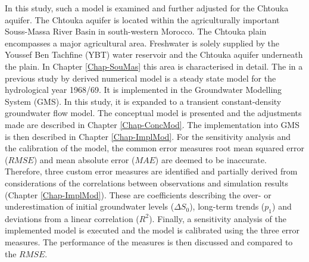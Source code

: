 In this study, such a model is examined and further adjusted for the Chtouka aquifer. The Chtouka aquifer is located within the agriculturally important Souss-Massa River Basin in south-western Morocco. The Chtouka plain encompasses a major agricultural area. Freshwater is solely supplied by the Youssef Ben Tachfine (YBT) water reservoir and the Chtouka aquifer underneath the plain. In Chapter \ref{Chap-SouMas} this area is characterised in detail. The in a previous study by \textcite{Horn.2021} derived numerical model is a steady state model for the hydrological year 1968/69. It is implemented in the Groundwater Modelling System (GMS). In this study, it is expanded to a transient constant-density groundwater flow model. The conceptual model is presented and the adjustments made are described in Chapter \ref{Chap-ConcMod}. The implementation into GMS is then described in Chapter \ref{Chap-ImplMod}. For the sensitivity analysis and the calibration of the model, the common error measures root mean squared error ($RMSE$) and mean absolute error ($MAE$) are deemed to be inaccurate. Therefore, three custom error measures are identified and partially derived from considerations of the correlations between observations and simulation results (Chapter \ref{Chap-ImplMod}). These are coefficients describing the over- or underestimation of initial groundwater levels ($\Delta S_0$), long-term trends ($p_1$) and deviations from a linear correlation ($R^2$). Finally, a sensitivity analysis of the implemented model is executed and the model is calibrated using the three error measures. The performance of the measures is then discussed and compared to the $RMSE$.